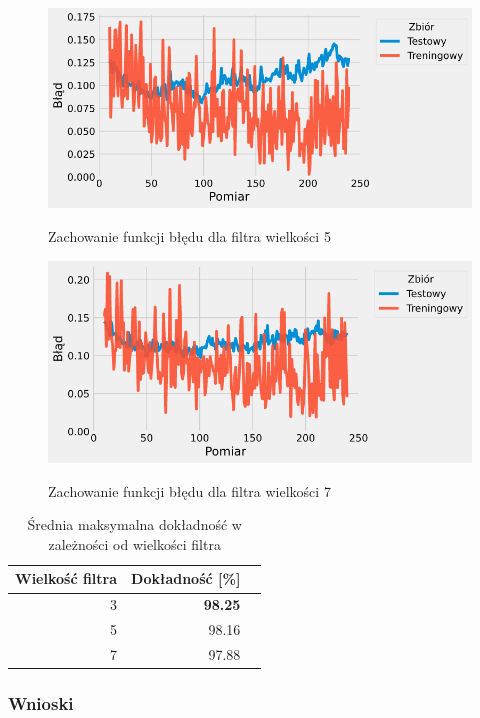 \documentclass{article}
\begin{document}
\begin{figure}[H]
	\centering
	\caption{Zachowanie funkcji błędu dla filtra wielkości 5}
	\includegraphics[width=\textwidth]{kernel_err_5.png}
	\label{fig:res14}
\end{figure}
\begin{figure}[H]
	\centering
	\caption{Zachowanie funkcji błędu dla filtra wielkości 7}
	\includegraphics[width=\textwidth]{kernel_err_7.png}
	\label{fig:res15}
\end{figure}

\begin{table}[H]
	\caption{Średnia maksymalna dokładność w zależności od wielkości filtra}
	\label{tabela-res-11}
	\centering
	\begin{tabular}{rrr}
		\toprule
		Wielkość filtra & Dokładność [\%] \\
		\midrule
		3                 & \textbf{98.25}     \\
		5                 & 98.16              \\
		7                 & 97.88              \\
		\bottomrule
	\end{tabular}
\end{table}

\subsubsection*{Wnioski}
\end{document}
